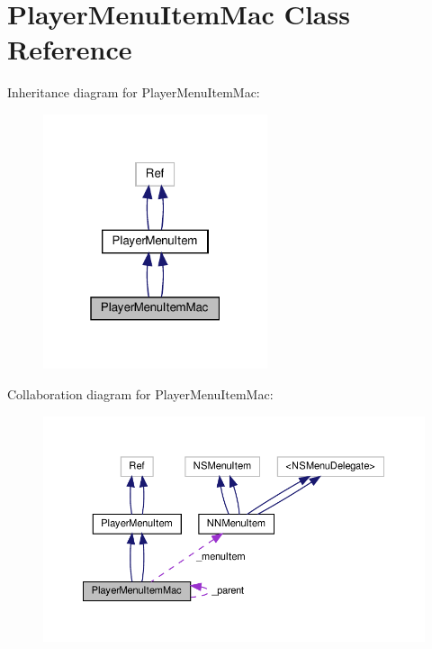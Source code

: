 \hypertarget{classPlayerMenuItemMac}{}\section{Player\+Menu\+Item\+Mac Class Reference}
\label{classPlayerMenuItemMac}


Inheritance diagram for Player\+Menu\+Item\+Mac\+:
\nopagebreak
\begin{figure}[H]
\begin{center}
\leavevmode
\includegraphics[width=187pt]{classPlayerMenuItemMac__inherit__graph}
\end{center}
\end{figure}


Collaboration diagram for Player\+Menu\+Item\+Mac\+:
\nopagebreak
\begin{figure}[H]
\begin{center}
\leavevmode
\includegraphics[width=350pt]{classPlayerMenuItemMac__coll__graph}
\end{center}
\end{figure}

